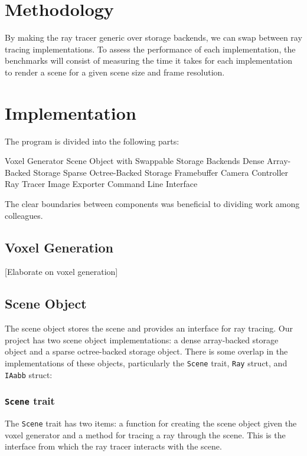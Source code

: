 \documentclass[conference]{IEEEtran}
\begin{document}
\section{Methodology}

By making the ray tracer generic over storage backends, we can swap between ray tracing implementations.
To assess the performance of each implementation, the benchmarks will consist of measuring the time it takes for each implementation to render a scene for a given scene size and frame resolution.

\section{Implementation}

The program is divided into the following parts:

\begin{outline}
\1 Voxel Generator
\1 Scene Object with Swappable Storage Backends
\2 Dense Array-Backed Storage
\2 Sparse Octree-Backed Storage
\1 Framebuffer
\1 Camera Controller
\1 Ray Tracer
\1 Image Exporter
\1 Command Line Interface
\end{outline}

The clear boundaries between components was beneficial to dividing work among colleagues.

\subsection{Voxel Generation}

[Elaborate on voxel generation]

\subsection{Scene Object}

The scene object stores the scene and provides an interface for ray tracing.
Our project has two scene object implementations: a dense array-backed storage object and a sparse octree-backed storage object.
There is some overlap in the implementations of these objects, particularly the \verb|Scene| trait, \verb|Ray| struct, and \verb|IAabb| struct:

\cprotect\subsubsection{\verb|Scene| trait}

The \verb|Scene| trait has two items: a function for creating the scene object given the voxel generator and a method for tracing a ray through the scene.
This is the interface from which the ray tracer interacts with the scene.
\end{document}

